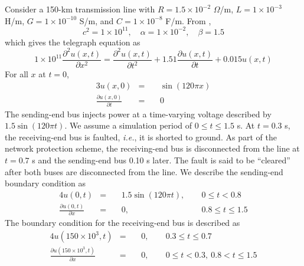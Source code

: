 \documentclass{article}
\begin{document}
Consider a 150-km transmission line with
$R = 1.5 \times 10^{-2}$ $\Omega$/m,
$L = 1 \times 10^{-3}$ H/m,
$G = 1 \times 10^{-10}$ S/m, and
$C = 1 \times 10^{-8}$ F/m.
From ,
\begin{equation*}
	c^{2} = 1 \times 10^{11}, \quad
	\alpha = 1 \times 10^{-2}, \quad
	\beta = 1.5
\end{equation*}
which gives the telegraph equation as
\begin{equation}
	\label{eqn: Telegraph eqn for Simulating a Faulted Bus}
	1 \times 10^{11} \frac{\partial^{2} u \left(x,t\right)}{\partial x^{2}}
	=
	\frac{\partial^{2} u \left(x,t\right)}{\partial t^{2}}
	+
	1.51 \frac{\partial u \left(x,t\right)}{\partial t}
	+
	0.015 u \left(x,t\right) 
\end{equation}
For all $x$ at $t = 0$,
\begin{alignat}{3}
	\label{eqn: mu for Simulating a Faulted Bus}
	u \left(x,0\right) &=\ && \sin \left(120 \pi x\right) \\
	\label{eqn: xi for Simulating a Faulted Bus}
	\frac{\partial u \left(x,0\right)}{\partial t} &=\ && 0
\end{alignat}
The sending-end bus injects power at a time-varying voltage described by $1.5 \sin \left(120 \pi t\right)$.
We assume a simulation period of $0 \leq t \leq 1.5$ s.
At $t = 0.3$ s, the receiving-end bus is faulted, \textit{i.e.},
it is shorted to ground.
As part of the network protection scheme,
the receiving-end bus is disconnected from the line at $t = 0.7$ s
and the sending-end bus 0.10 s later.
The fault is said to be ``cleared'' after both buses are disconnected from the line.
We describe the sending-end boundary condition as
\begin{alignat}{4}
	\label{eqn: Dirichlet condition for sending-end bus for Simulating a Faulted Bus}
	u \left(0,t\right) &=\ && 1.5 \sin \left(120 \pi t\right),\ \quad &0 \leq t < 0.8 \\
	\label{eqn: Neumann condition for sending-end bus for Simulating a Faulted Bus}
	\frac{\partial u \left(0,t\right)}{\partial x} &=\ && 0,\ \quad &0.8 \leq t \leq 1.5
\end{alignat}
The boundary condition for the receiving-end bus is described as
\begin{alignat}{4}
	\label{eqn: Dirichlet condition for receiving-end bus for Simulating a Faulted Bus}
	u \left(150 \times 10^{3}, t\right) &=\ &&0,\ \quad &0.3 \leq t \leq 0.7 \\
	\label{eqn: Neumann condiiton for receiving-end bus for Simulating a Faulted Bus}
	\frac{\partial u \left(150 \times 10^{3},t\right)}{\partial x} &=\ && 0,\ \quad &0 \leq t < 0.3,\ 0.8 < t \leq 1.5
\end{alignat}
\end{document}
